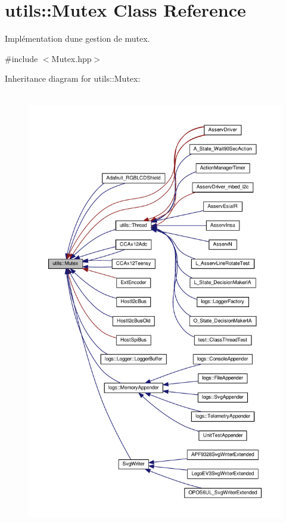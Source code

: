 \hypertarget{classutils_1_1Mutex}{}\section{utils\+:\+:Mutex Class Reference}
\label{classutils_1_1Mutex}


Implémentation d\textquotesingle{}une gestion de mutex.  




{\ttfamily \#include $<$Mutex.\+hpp$>$}



Inheritance diagram for utils\+:\+:Mutex\+:
\nopagebreak
\begin{figure}[H]
\begin{center}
\leavevmode
\includegraphics[height=550pt]{classutils_1_1Mutex__inherit__graph}
\end{center}
\end{figure}
